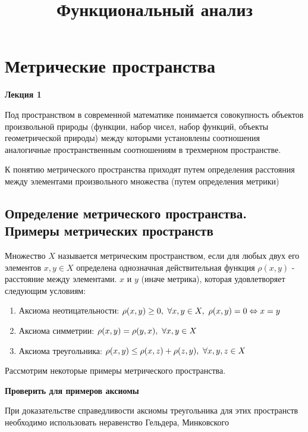 \documentclass[12pt]{report}
\title{\textbf{Функциональный анализ}}
\date{}
\newcommand{\be}{\begin{enumerate}}
\newcommand{\ee}{\end{enumerate}}
\renewcommand{\[}{$\\\displaystyle}
\renewcommand{\]}{\\$}
\renewcommand{\[}{$\\\displaystyle}
\newcommand{\sep}{,\ }
\begin{document}
\sloppy

\maketitle

\tableofcontents

\chapter{Метрические пространства}

\textbf{Лекция 1}

Под пространством в современной математике понимается совокупность объектов
произвольной природы (функции, набор чисел, набор функций, объекты
геометрической природы) между которыми установлены соотношения аналогичные пространственным соотношениям в трехмерном пространстве.

К понятию метрического пространства приходят путем определения расстояния между элементами произвольного множества (путем определения метрики)

\section{Определение метрического пространства. Примеры метрических пространств}

Множество $X$ называется метрическим пространством, если для любых двух его
элементов $x, y \in X$ определена однозначная действительная функция
$\rho(x, y)$ - расстояние между элементами. $x$ и $y$ (иначе метрика), которая
удовлетворяет следующим условиям:

\be
  \item Аксиома неотицательности:
  \[  \rho(x, y) \geq 0 \sep\forall x, y \in X\sep
  \rho(x, y) = 0 \Leftrightarrow x = y \]

  \item Аксиома симметрии:
  \[  \rho(x, y) = \rho(y, x)\sep \forall x, y \in X \]

  \item Аксиома треугольника:
  \[  \rho(x, y) \leq \rho(x, z) + \rho(z, y)\sep \forall x, y, z \in X \]
\ee

Рассмотрим некоторые примеры метрического пространства.

\textbf{Проверить для примеров аксиомы}

При доказательстве справедливости аксиомы треугольника для этих пространств необходимо использовать неравенство Гельдера, Минковского
\end{document}
